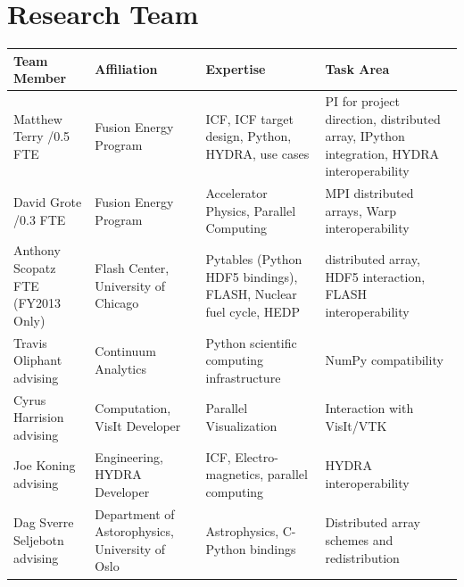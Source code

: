 \documentclass[letterpaper,11pt]{article}
\newlength{\DUtablewidth} %
\begin{document}
\section*{Research Team}

\setlength{\DUtablewidth}{\linewidth}
\begin{longtable*}[c]
	{|p{0.187\DUtablewidth}|p{0.251\DUtablewidth}|p{0.260\DUtablewidth}|p{0.251\DUtablewidth}|}
	\hline
	\textbf{Team Member} & \textbf{Affiliation} & \textbf{Expertise} & \textbf{Task Area} \\
	\endfirsthead
	\hline

	Matthew Terry /0.5 FTE &
	Fusion Energy Program &
	ICF, ICF target design, Python, HYDRA, use cases &
	PI for project direction,
	distributed array, IPython integration, HYDRA interoperability \\
	\hline

	David Grote /0.3 FTE &
	Fusion Energy Program &
	Accelerator Physics, Parallel Computing &
	MPI distributed arrays, Warp interoperability \\
	\hline

	Anthony Scopatz  FTE (FY2013 Only) &
	Flash Center, \newline
	University of Chicago &
	Pytables (Python HDF5 bindings), FLASH, Nuclear fuel cycle, HEDP &
	distributed array, HDF5 interaction, FLASH interoperability \\
	\hline

	Travis Oliphant \newline
	advising &
	Continuum Analytics &
	Python scientific computing infrastructure &
	NumPy compatibility \\
	\hline

	Cyrus Harrision \newline
	advising &
	Computation, \newline
	VisIt Developer &
	Parallel Visualization &
	Interaction with VisIt/VTK  \\
	\hline

	Joe Koning \newline
	advising &
	Engineering, \newline
	HYDRA Developer & 
	ICF, Electro-magnetics, parallel computing & 
	HYDRA interoperability \\
	\hline

	Dag Sverre Seljebotn \newline
	advising &
	Department of Astorophysics, \newline
	University of Oslo &
	Astrophysics, C-Python bindings &
	Distributed array schemes and redistribution \\
	\hline
\end{longtable*}

\newpage



\end{document}
